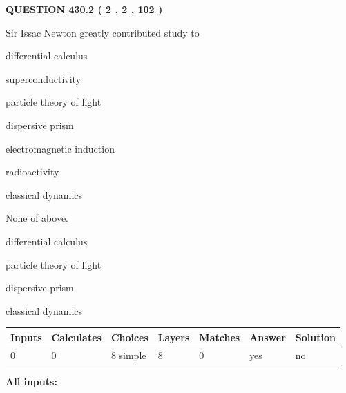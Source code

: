 \documentclass[12pt]{article}
\begin{document}
\vspace{0.2in}
  
{\textbf{\Large{QUESTION
430.2 
 ( 2 , 2 , 102 )
}}}
  
  
Sir Issac Newton greatly contributed study to
 
 
differential calculus
 
 
superconductivity
 
 
particle theory of light
 
 
dispersive prism
 
 
electromagnetic induction
 
 
radioactivity
 
 
classical dynamics
 
 
 None of above.
 
 
\noindent{}
 
 
differential calculus
 
 
particle theory of light
 
 
dispersive prism
 
 
classical dynamics
 
 
\noindent{}
 
 
   
   
   
   
\noindent\begin{tabular}{|l|l|l|l|l|l|l|}
 \hline
Inputs & Calculates & Choices & Layers & Matches & Answer & Solution \\ \hline
 0  & 
 0  & 
 8
  simple  
  & 
 8  & 
 0  & 
  yes & 
  no 
  \\ \hline
 \end{tabular}
   
   
   
   
\noindent{}
   
   
   
   
\noindent\vspace{0.1in}\hspace{-0.08in} {\textbf{\Large{All inputs: }}}
   
\end{document}
